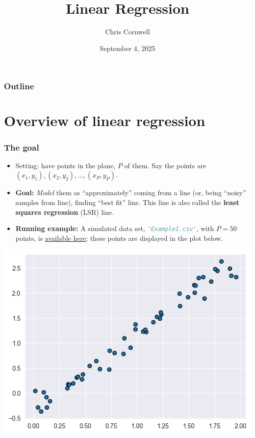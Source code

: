 \documentclass{beamer}
\author{Chris Cornwell}
\date{September 4, 2025}
\title{Linear Regression}
\theoremstyle{example}
\newcommand{\ct}[1]{\lstinline[language=Python,basicstyle=\ttfamily\footnotesize,stringstyle=\small\color{strings}]!#1!}
\begin{document}
\begin{frame}
\titlepage
\end{frame}

\begin{frame}
\frametitle{Outline}
\tableofcontents
\end{frame}

\section{Overview of linear regression}

\begin{frame}[fragile]
\frametitle{The goal}
\begin{itemize}
    \item Setting: have points in the plane, $P$ of them. Say the points are $(x_1,y_1), (x_2,y_2), \ldots, (x_P,y_P)$.
    \item \textbf{Goal:} \emph{Model} them as ``approximately'' coming from a line (or, being ``noisy'' samples from line), finding ``best fit'' line.  This line is also called the \textbf{least squares regression} (LSR) line.
    \pause
    \item \textbf{Running example:} A simulated data set, \ct{'Example1.csv'}, with $P=50$ points, is \href{https://github.com/cornwell/math371-F25/blob/main/DataSets/}{available here}; these points are displayed in the plot below.
\end{itemize}

\centering
\includegraphics[height=0.3\textheight]{example1.png}

\end{frame}
\end{document}
